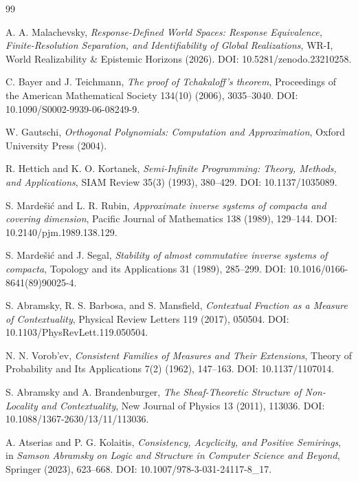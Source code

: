 \documentclass[11pt]{article}
\begin{document}
\begin{thebibliography}{99}

A. A. Malachevsky,
\emph{Response-Defined World Spaces: Response Equivalence,
Finite-Resolution Separation, and Identifiability of Global Realizations},
WR-I, World Realizability \& Epistemic Horizons (2026).
DOI: 10.5281/zenodo.23210258.




C. Bayer and J. Teichmann,
\emph{The proof of Tchakaloff's theorem},
Proceedings of the American Mathematical Society 134(10) (2006), 3035--3040.
DOI: 10.1090/S0002-9939-06-08249-9.

W. Gautschi,
\emph{Orthogonal Polynomials: Computation and Approximation},
Oxford University Press (2004).

R. Hettich and K. O. Kortanek,
\emph{Semi-Infinite Programming: Theory, Methods, and Applications},
SIAM Review 35(3) (1993), 380--429.
DOI: 10.1137/1035089.

S. Marde\v{s}i\'c and L. R. Rubin,
\emph{Approximate inverse systems of compacta and covering dimension},
Pacific Journal of Mathematics 138 (1989), 129--144.
DOI: 10.2140/pjm.1989.138.129.

S. Marde\v{s}i\'c and J. Segal,
\emph{Stability of almost commutative inverse systems of compacta},
Topology and its Applications 31 (1989), 285--299.
DOI: 10.1016/0166-8641(89)90025-4.

S. Abramsky, R. S. Barbosa, and S. Mansfield,
\emph{Contextual Fraction as a Measure of Contextuality},
Physical Review Letters 119 (2017), 050504.
DOI: 10.1103/PhysRevLett.119.050504.

N. N. Vorob'ev,
\emph{Consistent Families of Measures and Their Extensions},
Theory of Probability and Its Applications 7(2) (1962), 147--163.
DOI: 10.1137/1107014.

S. Abramsky and A. Brandenburger,
\emph{The Sheaf-Theoretic Structure of Non-Locality and Contextuality},
New Journal of Physics 13 (2011), 113036.
DOI: 10.1088/1367-2630/13/11/113036.

A. Atserias and P. G. Kolaitis,
\emph{Consistency, Acyclicity, and Positive Semirings},
in \emph{Samson Abramsky on Logic and Structure in Computer Science and Beyond},
Springer (2023), 623--668.
DOI: 10.1007/978-3-031-24117-8\_17.

\end{thebibliography}
\end{document}
